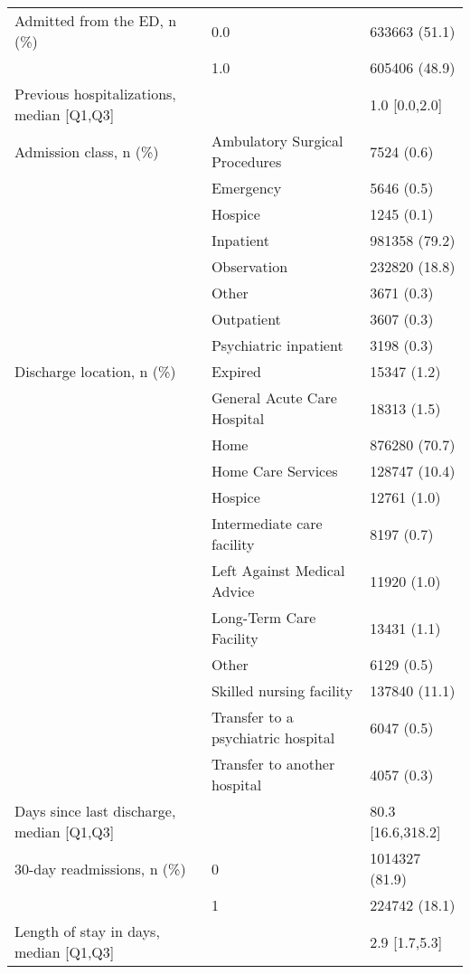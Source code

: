 \begin{tabular}{lll}
Admitted from the ED, n (\%) & 0.0 &      633663 (51.1) \\
                                       & 1.0 &      605406 (48.9) \\
Previous hospitalizations, median [Q1,Q3] &   &      1.0 [0.0,2.0] \\
Admission class, n (\%) & Ambulatory Surgical Procedures &         7524 (0.6) \\
                                       & Emergency &         5646 (0.5) \\
                                       & Hospice &         1245 (0.1) \\
                                       & Inpatient &      981358 (79.2) \\
                                       & Observation &      232820 (18.8) \\
                                       & Other &         3671 (0.3) \\
                                       & Outpatient &         3607 (0.3) \\
                                       & Psychiatric inpatient &         3198 (0.3) \\
Discharge location, n (\%) & Expired &        15347 (1.2) \\
                                       & General Acute Care Hospital &        18313 (1.5) \\
                                       & Home &      876280 (70.7) \\
                                       & Home Care Services &      128747 (10.4) \\
                                       & Hospice &        12761 (1.0) \\
                                       & Intermediate care facility &         8197 (0.7) \\
                                       & Left Against Medical Advice &        11920 (1.0) \\
                                       & Long-Term Care Facility &        13431 (1.1) \\
                                       & Other &         6129 (0.5) \\
                                       & Skilled nursing facility &      137840 (11.1) \\
                                       & Transfer to a psychiatric hospital &         6047 (0.5) \\
                                       & Transfer to another hospital &         4057 (0.3) \\
Days since last discharge, median [Q1,Q3] &   &  80.3 [16.6,318.2] \\
30-day readmissions, n (\%) & 0 &     1014327 (81.9) \\
                                       & 1 &      224742 (18.1) \\
Length of stay in days, median [Q1,Q3] &   &      2.9 [1.7,5.3] \\
\bottomrule
\end{tabular}
